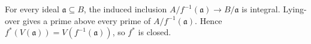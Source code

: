 For every ideal $\mathfrak{a}\subseteq B$, the induced inclusion $A/f^{-1}(\mathfrak{a})\to B/\mathfrak{a}$ is integral. Lying-over gives a prime above every prime of $A/f^{-1}(\mathfrak{a})$. Hence $f^*(V(\mathfrak{a}))=V(f^{-1}(\mathfrak{a}))$, so $f^*$ is closed.
